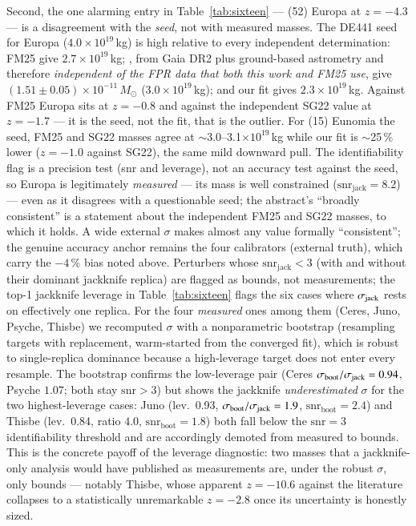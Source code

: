 \documentclass{aa}
\begin{document}
Second, the one alarming entry in Table~\ref{tab:sixteen} --- (52) Europa at
$z=-4.3$ --- is a disagreement with the \emph{seed}, not with measured masses.
The DE441 seed for Europa ($4.0\times10^{19}$\,kg) is high relative to every
independent determination: FM25 give $2.7\times10^{19}$\,kg;
\citet{siltala2022}, from Gaia DR2 plus ground-based astrometry and therefore
\emph{independent of the FPR data that both this work and FM25 use}, give
$(1.51\pm0.05)\times10^{-11}\,M_\odot$ ($3.0\times10^{19}$\,kg); and our fit
gives $2.3\times10^{19}$\,kg. Against FM25 Europa sits at $z=-0.8$ and against
the independent SG22 value at $z=-1.7$ --- it is the seed, not the fit, that is
the outlier. For (15) Eunomia the seed, FM25 and SG22 masses agree at
$\sim$3.0--3.1$\times10^{19}$\,kg while our fit is $\sim$25\,\% lower ($z=-1.0$
against SG22), the same mild downward pull. The identifiability flag is a
precision test (snr and leverage), not an accuracy test against the seed, so
Europa is legitimately \emph{measured} --- its mass is well constrained
($\mathrm{snr_{jack}}=8.2$) --- even as it disagrees with a questionable seed;
the abstract's ``broadly consistent'' is a statement about the independent FM25
and SG22 masses, to which it holds. A wide external $\sigma$ makes almost any
value formally ``consistent''; the genuine accuracy anchor remains the four
calibrators (external truth), which carry the $-4$\,\% bias noted above. Perturbers whose $\mathrm{snr_{jack}}<3$ (with and without their
dominant jackknife replica) are flagged as bounds, not measurements; the top-1
jackknife leverage in Table~\ref{tab:sixteen} flags the six cases where
$\sigma_{\rm jack}$ rests on effectively one replica. For the four \emph{measured}
ones among them (Ceres, Juno, Psyche, Thisbe) we recomputed $\sigma$ with a
nonparametric bootstrap (resampling targets with replacement, warm-started from the
converged fit), which is robust to single-replica dominance because a high-leverage
target does not enter every resample. The bootstrap confirms the low-leverage pair
(Ceres $\sigma_{\rm boot}/\sigma_{\rm jack}=0.94$, Psyche $1.07$; both stay
$\mathrm{snr}>3$) but shows the jackknife \emph{underestimated} $\sigma$ for the two
highest-leverage cases: Juno (lev.\ 0.93, $\sigma_{\rm boot}/\sigma_{\rm jack}=1.9$,
$\mathrm{snr_{boot}}=2.4$) and Thisbe (lev.\ 0.84, ratio $4.0$,
$\mathrm{snr_{boot}}=1.8$) both fall below the $\mathrm{snr}=3$ identifiability
threshold and are accordingly demoted from measured to bounds. This is the concrete
payoff of the leverage diagnostic: two masses that a jackknife-only analysis would
have published as measurements are, under the robust $\sigma$, only bounds ---
notably Thisbe, whose apparent $z=-10.6$ against the literature collapses to a
statistically unremarkable $z=-2.8$ once its uncertainty is honestly sized.
\end{document}
